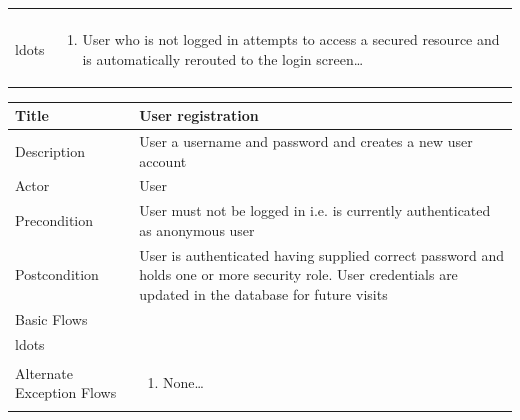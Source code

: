 \documentclass[a4paper,Times New Roman 11pt]{article}
\newcommand\addrow[2]{#1 &#2\\ }
\newcommand\addheading[2]{#1 &#2\\ \hline}
\newcommand\tabularhead{\begin{tabular}{lp{9cm}}
\hline
}
\newcommand\addmulrow[2]{ \begin{minipage}[t][][t]{3cm}#1\end{minipage}%
   &\begin{minipage}[t][][t]{9cm}
    \begin{enumerate} #2   \end{enumerate}
    \end{minipage}\\ }
\newenvironment{usecase}{\tabularhead}
{\hline\end{tabular}}
\begin{document}
\begin{samepage}
\begin{usecase}
{                                  \item User enters username and password and clicks login\ldots
                                  \item Controller method checks username and password against user repository. If credentials are matched to repository logs user in and set the user as authenticate, allocating any roles held by that user
                                  \item If credentials are not matched to repository then display login failed message and redisplay the login screen\\ldots}
  \addmulrow{Alternate Exception Flows}{\item User who is not logged in attempts to access a secured resource and is automatically rerouted to the login screen\ldots}
                                  
\end{usecase}

\begin{usecase}
    \addheading{Title}{User registration}
  \addheading{Description}{User a username and password and creates a new user account}
  
  \addheading{Actor}{User} 
  \addrow{Precondition}{User must not be logged in i.e. is currently authenticated as anonymous user}
  \addrow{Postcondition}{User is authenticated having supplied correct password and holds one or more security role. User credentials are updated in the database for future visits}
  \addmulrow{Basic Flows}{\item User navigates to register area via base template button which is shown on all pages when the user is not currently logged in \ldots
                                  \item User enters username and password and clicks login\ldots
                                  \item Controller method checks username and password against user repository. If credentials supplied are valid, and do not duplicate an existing user account the user is set to a logged in stage and the database is updated
                                  \item If credentials are matched to an existing user record in the repository display the registration failed message and redisplay the registration form screen\\ldots}
  \addmulrow{Alternate Exception Flows}{\item None\ldots}
                                  

\end{usecase}
\end{samepage}
\end{document}
